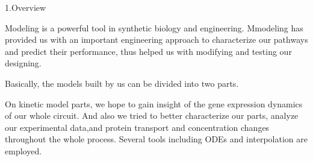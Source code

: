 \documentclass[a4paper,10pt]{article}
\begin{document}
	\begin{center}
		{\Large 1.Overview} 
	\end{center}
   Modeling is a powerful tool in synthetic biology and engineering. Mmodeling has provided us with an important engineering approach to characterize our pathways and predict their performance, thus helped us with modifying and testing our designing.
	
	Basically, the models built by us can be divided into two parts.
	
	On kinetic model parts, we hope to gain insight of the gene expression dynamics of our whole circuit. And also we tried to better characterize our parts, analyze our experimental data,and protein transport and concentration changes throughout the whole process. Several tools including ODEs and interpolation are employed.
\end{document}
